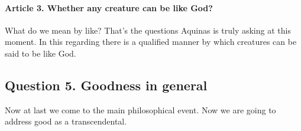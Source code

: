 \documentclass{ucetd}
\begin{document}
\paragraph{Article 3. Whether any creature can be like God?}
What do we mean by like? That's the questions Aquinas is truly asking at this moment. In this regarding there is a qualified manner by which creatures can be said to be like God.


\subsection{Question 5. Goodness in general}
Now at last we come to the main philosophical event. Now we are going to address good as a transcendental.
\end{document}
